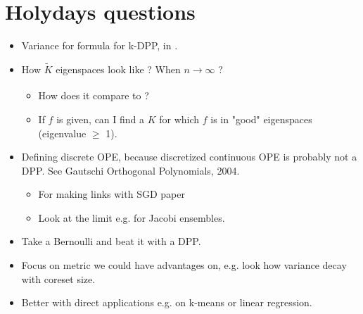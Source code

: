 \documentclass{article} %
\newcommand{\1}{\mathds{1}} %
\theoremstyle{definition} %
\begin{document}
\section{Holydays questions}
\begin{itemize}
	\item Variance for formula for k-DPP, in \cite{zhang2017dppminibatch}.
	\item How $\tilde K$ eigenspaces look like ? When $n \xrightarrow[]{} \infty$ ?
	\begin{itemize}
		\item How does it compare to \cite{bardenet2020mcdpp} ?
		\item If $f$ is given, can I find a $K$ for which $f$ is in "good" eigenspaces (eigenvalue $\geq$ 1).
	\end{itemize}
	\item Defining discrete OPE, because discretized continuous OPE is probably not a DPP. See Gautschi Orthogonal Polynomials, 2004.
	\begin{itemize}
		\item For making links with SGD paper \cite{bardenet2021sgddpp}
		\item Look at the limit e.g. for Jacobi ensembles. 
	\end{itemize}
\end{itemize}
\begin{itemize}
	\item Take a Bernoulli and beat it with a DPP.
	\item Focus on metric we could have advantages on, e.g. look how variance decay with coreset size. 
	\item Better with direct applications e.g. on k-means or linear regression.
\end{itemize}
	
	\vfill
	
	
	\printbibliography
%	 
%	 
	
\end{document}
